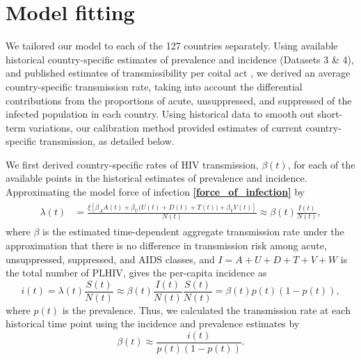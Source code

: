 \documentclass{article}
\renewcommand{\eqref}[1]{\textbf{\ref{#1}}}
\begin{document}
\section{Model fitting}
\label{model_fitting}

We tailored our model to each of the 127 countries separately.  Using
available historical country-specific estimates of prevalence and
incidence (Datasets 3 \& 4), and published estimates of
transmissibility per coital
act \cite{Wawer2005-us, Donnell2010-xo, Hughes2012-so,
  Skarbinski2015-ni},
we derived an average country-specific transmission rate, taking into
account the differential contributions from the proportions of acute,
unsuppressed, and suppressed of the infected population in each
country.  Using historical data to smooth out short-term variations,
our calibration method provided estimates of current country-specific
transmission, as detailed below.

We first derived country-specific rates of HIV transmission,
$\beta(t)$, for each of the available points in the historical
estimates of prevalence and incidence.  Approximating the model
force of infection \eqref{force_of_infection} by
\begin{align}
  \label{foi}
  \begin{split}
    \lambda(t) &= \frac{\xi \left[\beta_{A} A(t)
        + \beta_{U} \big(U(t) + D(t) + T(t)\big) +
        \beta_{V} V(t)\right]}{N(t)}
    \approx  \beta(t) \frac{I(t)}{N(t)},
  \end{split}
\end{align}
where $\beta$ is the estimated time-dependent aggregate transmission
rate under the approximation that there is no difference in
transmission risk among acute, unsuppressed, suppressed, and AIDS
classes, and $I = A + U + D + T + V + W$ is the total number of PLHIV,
gives the per-capita incidence as
\begin{equation}
i(t) = \lambda(t) \frac{S(t)}{N(t)}
\approx \beta(t) \frac{I(t)}{N(t)} \frac{S(t)}{N(t)} =\beta(t) p(t) (1-p(t)),
\end{equation}
where $p(t)$ is the prevalence. Thus, we calculated the transmission
rate at each historical time point using the incidence and prevalence
estimates by
\begin{equation}
  \label{trans_rate}
  \beta(t) \approx \frac{i(t)}{p(t)(1-p(t))}.
\end{equation}
\end{document}
